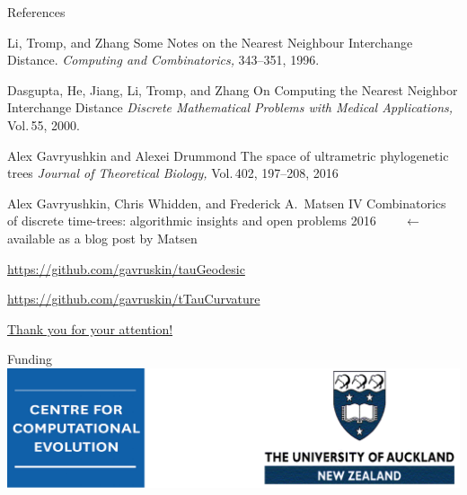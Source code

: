 \documentclass{beamer}
\begin{document}
\begin{frame}{References}


\scriptsize

Li, Tromp, and Zhang
\newblock Some Notes on the Nearest Neighbour Interchange Distance.
\newblock \emph{Computing and Combinatorics,} 343--351, 1996.

Dasgupta, He, Jiang, Li, Tromp, and Zhang
\newblock On Computing the Nearest Neighbor Interchange Distance
\newblock \emph{Discrete Mathematical Problems with Medical Applications,} Vol.\,55, 2000.

Alex Gavryushkin and Alexei Drummond
\newblock The space of ultrametric phylogenetic trees
\newblock \emph{Journal of Theoretical Biology,} Vol.\,402, 197--208, 2016

Alex Gavryushkin, Chris Whidden, and Frederick A.\ Matsen IV
\newblock Combinatorics of discrete time-trees: algorithmic insights and open problems
 2016 ~~~ $\leftarrow$ ~~~ available as a blog post by Matsen

\url{https://github.com/gavruskin/tauGeodesic}

\url{https://github.com/gavruskin/tTauCurvature}
\end{frame}

\begin{frame}{\href{http://alex.gavruskin.com/pictures/}{\Large{Thank you for your attention!}}}
\begin{block}{Funding}
\centering
\includegraphics[width=\framewidth]{UniAuckland.png}
\end{block}
\end{frame}
\end{document}
